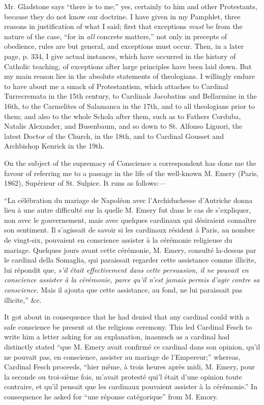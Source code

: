 Mr. Gladstone says ``there is to me;'' yes, certainly to him
and other Protestants, because they do not know our doctrine. I have
given in my Pamphlet, three reasons in justification of what I said;
first that exceptions \emph{must} be from the nature of the case, ``for in \emph{all}
concrete matters,'' not only in precepts of obedience, rules are but
general, and exceptions must occur. Then, in a later page, p. 334, I
give actual instances, which have occurred in the history of
Catholic teaching, of exceptions after large principles have been laid
down. But my main reason lies in the absolute statements of theologians.
I willingly endure to have about me a smack of Protestantism, which
attaches to Cardinal Turrecremata in the 15th century, to Cardinals
Jacobatius and Bellarmine in the 16th, to the Carmelites of Salamanca in
the 17th, and to all theologians prior to them; and also to the whole
Schola after them, such as to Fathers Corduba, Natalis Alexander, and
Busenbaum, and so down to St. Alfonso Liguori, the latest Doctor of the
Church, in the 18th, and to Cardinal Gousset and Archbishop Kenrick in
the 19th.

On the subject of the supremacy of Conscience a correspondent has
done me the favour of referring me to a passage in the life of the
well-known M. Emery (Paris, 1862), Supérieur of St. Sulpice. It runs as
follows:—

``La célébration du mariage de Napoléon avec l'Archiduchesse
d'Autriche donna lieu à une autre difficulté sur la quelle M. Emery
fut dans le cas de s'expliquer, non avec le gouvernement, mais avec
quelques cardinaux qui désiraient connaître son sentiment. Il
s'agissait de savoir si les cardinaux résident à Paris, au nombre de
vingt-six, pouvaient en conscience assister à la cérémonie religieuse
du mariage. Quelques jours avant cette cérémonie, M. Emery, consulté
la-dessus par le cardinal della Somaglia, qui paraissait regarder cette
assistance comme illicite, lui répondit que, \emph{s'il était
effectivement dans cette persuasion, il ne pouvait en conscience
assister à la cérémonie, parce qu'il n'est jamais} \emph{permis
d'agir contre sa conscience}. Mais il ajouta que cette assistance, au
fond, ne lui paraissait pas illicite,'' \&c.

It got about in consequence that he had denied that any cardinal
could with a safe conscience be present at the religious ceremony. This
led Cardinal Fesch to write him a letter asking for an explanation,
inasmuch as a cardinal had distinctly stated ``que M. Emery avait
confirmé ce cardinal dans son opinion, qu'il ne pouvait pas, en
conscience, assister au mariage de l'Empereur;'' whereas, Cardinal
Fesch proceeds, ``hier même, à trois heures après midi, M. Emery,
pour la seconde ou troi-sième fois, m'avait protesté qui'l était
d'une opinion toute contraire, et qu'il pensait que les cardinaux
pouvaient assister à la cérémonie.'' In consequence he asked for
``une réponse catégorique'' from M. Emory.

